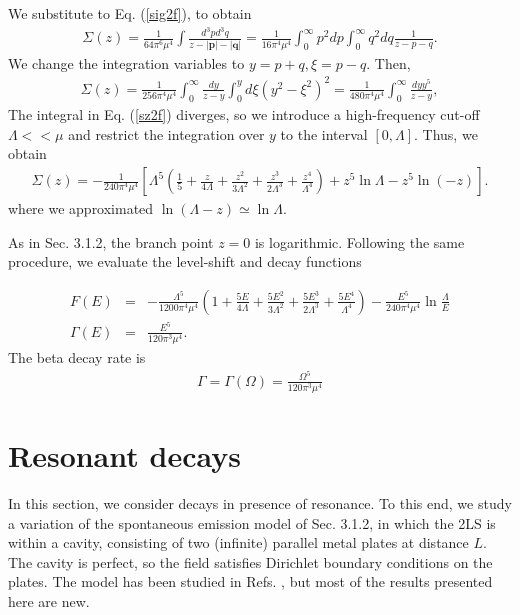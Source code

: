 \documentclass[12pt]{article}
\numberwithin{equation}{section}
\begin{document}
   We substitute to  Eq. (\ref{sig2f}), to obtain
  \begin{eqnarray}
  \Sigma(z) = \frac{1}{64 \pi^6 \mu^4} \int \frac{d^3p d^3q}{z - |\pmb p| - |{\pmb q}|} = \frac{1}{16 \pi^4 \mu^4} \int_0^{\infty}p^2dp \int_0^{\infty} q^2 dq  \frac{1}{z-p-q}.
  \end{eqnarray}
We change the integration  variables to $y = p+q, \xi = p-q$. Then,
  \begin{eqnarray}
  \Sigma(z) =   \frac{1}{256 \pi^4 \mu^4} \int_0^{\infty}\frac{dy}{z-y} \int_0^y d\xi (y^2-\xi^2)^2 = \frac{1}{480\pi^4 \mu^4}\int_0^{\infty} \frac{dy y^5}{z-y}, \label{sz2f}
  \end{eqnarray}
The integral in Eq. (\ref{sz2f}) diverges, so we introduce a high-frequency cut-off $\Lambda << \mu$ and restrict the integration over $y$ to the interval $[0, \Lambda]$. Thus, we obtain
\begin{eqnarray}
\Sigma(z) = - \frac{1}{240 \pi^4 \mu^4} \left[ \Lambda^5\left(\frac{1}{5} + \frac{z}{4 \Lambda}  + \frac{z^2}{3\Lambda^2} + \frac{z^3}{2\Lambda^3} + \frac{z^4}{\Lambda^4}\right)+z^5 \ln \Lambda -z^5 \ln(-z)   \right].
\end{eqnarray}
where we approximated  $\ln(\Lambda- z) \simeq \ln \Lambda$.

As in Sec. 3.1.2, the branch point $z = 0$ is logarithmic. Following the same procedure, we evaluate the level-shift and decay functions

\begin{eqnarray}
F(E) &=& - \frac{\Lambda^5}{1200\pi^4 \mu^4} \left(1+ \frac{5E}{4 \Lambda} + \frac{5E^2}{3\Lambda^2} + \frac{5E^3}{2\Lambda^3} + \frac{5E^4}{\Lambda^4}\right) - \frac{E^5}{240 \pi^4 \mu^4}  \ln\frac{\Lambda}{E}
\\
\Gamma(E) &=& \frac{E^5}{120 \pi^3 \mu^4}.  \label{gamma2ef}
\end{eqnarray}
The beta decay rate is
\begin{eqnarray}
\Gamma = \Gamma(\Omega) =  \frac{\Omega^5}{120 \pi^3 \mu^4}
\end{eqnarray}


\section{Resonant decays}
In this section, we consider decays in presence of resonance. To this end, we study  a  variation of the spontaneous emission model of Sec. 3.1.2, in which the 2LS is  within a cavity, consisting of two (infinite) parallel metal plates at distance $L$.  The cavity is perfect, so the field satisfies Dirichlet boundary conditions on the plates.   The model has been studied in Refs. \cite{AnHu, Cum}, but most of the results presented here are new.
\end{document}
